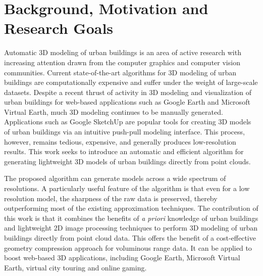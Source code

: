 \documentclass[12pt,letterpaper]{article}
\newcommand{\twocol}{0}
\renewcommand{\twocol}{true}
\begin{document}
\ifthenelse{\equal{\twocol}{true}}{
}{
\newpage %
}
\section{Background, Motivation and Research Goals}
Automatic 3D modeling of urban buildings is an area of active research
with increasing attention drawn from the computer graphics and
computer vision communities.
Current state-of-the-art algorithms for 3D modeling of urban buildings are
computationally expensive and suffer under the weight of large-scale datasets.
Despite a recent thrust of activity in 3D modeling and visualization of
urban buildings for web-based applications such as Google Earth and Microsoft
Virtual Earth, much 3D modeling continues to be manually generated.
Applications such as Google SketchUp are popular tools for creating
3D models of urban buildings via an intuitive push-pull modeling interface.
This process, however, remains tedious, expensive, and generally produces
low-resolution results.
This work seeks to introduce an automatic and efficient algorithm for
generating lightweight 3D models of urban buildings directly from point clouds.

The proposed algorithm can generate models across a wide spectrum of
resolutions.
A particularly useful feature of the algorithm is that even for a low
resolution model, the sharpness of the raw data is preserved, thereby
outperforming most of the existing approximation techniques.
The contribution of this work is that it combines the benefits of
\emph{a priori} knowledge of urban buildings and lightweight 2D image
processing techniques to perform 3D modeling of urban buildings directly
from point cloud data.
This offers the benefit of a cost-effective geometry compression
approach for voluminous range data.
It can be applied to boost web-based 3D applications, including
Google Earth, Microsoft Virtual Earth, virtual city touring and online gaming.


\end{document}
